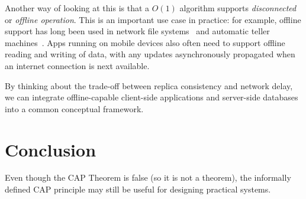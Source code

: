\documentclass[a4paper,twocolumn,10pt]{article}
\begin{document}
Another way of looking at this is that a $O(1)$ algorithm supports \emph{disconnected} or
\emph{offline operation}. This is an important use case in practice: for example, offline support
has long been used in network file systems~\cite{Kistler1992bt} and automatic teller
machines~\cite{Brewer2012tr}. Apps running on mobile devices also often need to support offline
reading and writing of data, with any updates asynchronously propagated when an internet connection
is next available.

By thinking about the trade-off between replica consistency and network delay, we can integrate
offline-capable client-side applications and server-side databases into a common conceptual
framework.



\section{Conclusion}

Even though the CAP Theorem is false (so it is not a theorem), the informally defined CAP principle
may still be useful for designing practical systems.

\cite{Lynch1989kj}
\cite{Fischer1985tt}
\cite{Sewell2010fj}



{\footnotesize

{}}
\end{document}
